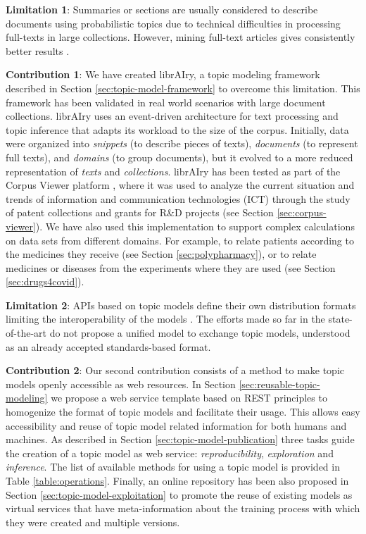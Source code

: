 \textbf{Limitation 1}: Summaries or sections are usually considered to describe documents using probabilistic topics due to technical difficulties in processing full-texts in large collections. However, mining full-text articles gives consistently better results \citep{Westergaard2017}.

\textbf{Contribution 1}: We have created librAIry, a topic modeling framework described in Section \ref{sec:topic-model-framework} to overcome this limitation. This framework has been validated in real world scenarios with large document collections. librAIry uses an event-driven architecture for text processing and topic inference that adapts its workload to the size of the corpus. Initially, data were organized into \textit{snippets} (to describe pieces of texts), \textit{documents} (to represent full texts), and \textit{domains} (to group documents), but it  evolved to a more reduced representation of \textit{texts} and \textit{collections}. librAIry has been tested as part of the Corpus Viewer platform \citep{Samy2019}, where it was used to analyze the current situation and trends of information and communication technologies (ICT) through the study of patent collections and grants for R\&D projects (see Section \ref{sec:corpus-viewer}). We have also used this implementation to support complex calculations on data sets from different domains. For example, to relate patients according to the medicines they receive \citep{Badenes-Olmedo2019c} (see Section 	\ref{sec:polypharmacy}), or to relate medicines or diseases from the experiments where they are used (see Section \ref{sec:drugs4covid}). 


\textbf{Limitation 2}: APIs based on topic models define their own distribution formats limiting the interoperability of the models \citep{Lisena:NLPOSS2020}. The efforts made so far in the state-of-the-art do not propose a unified model to exchange topic models, understood as an already accepted standards-based format.

\textbf{Contribution 2}: Our second contribution consists of a method to make topic models openly accessible as web resources. In Section \ref{sec:reusable-topic-modeling} we propose a web service template based on REST principles to homogenize the format of topic models and facilitate their usage. This allows easy accessibility and reuse of topic model related information for both humans and machines. As described in Section \ref{sec:topic-model-publication} three tasks guide the creation of a topic model as web service: \textit{reproducibility}, \textit{exploration} and \textit{inference}. The list of available methods for using a topic model is provided in Table \ref{table:operations}. Finally, an online repository has been also proposed in Section \ref{sec:topic-model-exploitation} to promote the reuse of existing models as virtual services that have meta-information about the training process with which they were created and multiple versions. 

